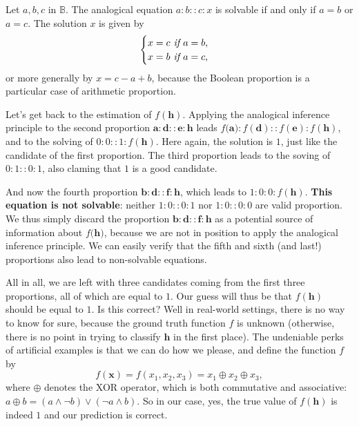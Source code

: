 \begin{proposition}
  Let $a, b, c$ in $\mathbb{B}$. The analogical equation
  $a :b::c:x$
  is solvable if and only if $a = b$ or $a = c$. The solution $x$ is given by
  $$
  \begin{cases}
    x = c \emph{ if } a = b,\\
    x = b \emph{ if } a = c,
  \end{cases}
  $$
  or more generally by $x = c - a + b$, because the Boolean proportion is a
  particular case of arithmetic proportion.
\end{proposition}

Let's get back to the estimation of $f(\mathbf{h})$. Applying the analogical
inference principle to the second proportion $\mathbf{a} : \mathbf{d} ::
\mathbf{e} : \mathbf{h}$ leads $f(\mathbf{a)} : f(\mathbf{d}) :: f(\mathbf{e})
: f(\mathbf{h})$, and to the solving of $0:0::1:f(\mathbf{h})$. Here again, the
solution is $1$, just like the candidate of the first proportion.
The third proportion leads to the soving of $0:1::0:1$, also claming that $1$
is a good candidate.

And now the fourth proportion $\mathbf{b} : \mathbf{d} :: \mathbf{f} :
\mathbf{h}$, which leads to $1:0:0:f(\mathbf{h})$. \textbf{This equation is not
solvable}: neither $1:0::0:1$ nor $1:0::0:0$ are valid proportion. We thus
simply discard the proportion $\mathbf{b} : \mathbf{d} :: \mathbf{f} :
\mathbf{h}$ as a potential source of information about $f(\mathbf{h)}$, because
we are not in position to apply the analogical inference principle. We can
easily verify that the fifth and sixth (and last!) proportions also lead to
non-solvable equations.

All in all, we are left with three candidates coming from the first three
proportions, all of which are equal to $1$. Our guess will thus be that
$f(\mathbf{h})$ should be equal to $1$. Is this correct? Well in real-world
settings, there is no way to know for sure, because the ground truth function
$f$ is unknown (otherwise, there is no point in trying to classify $\mathbf{h}$
in the first place). The undeniable perks of artificial examples is that we can
do how we please, and define the function $f$ by
$$f(\mathbf{x}) = f(x_1, x_2, x_3) = x_1 \oplus x_2 \oplus x_3,$$
where $\oplus$ denotes the XOR operator, which is both commutative and
associative: $a \oplus b = (a \wedge \neg b) \vee (\neg a \wedge b)$. So in our
case, yes, the true value of $f(\mathbf{h})$ is indeed $1$ and our prediction
is correct.

